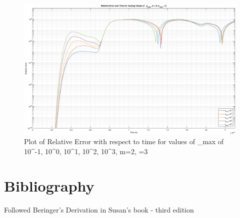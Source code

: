 \documentclass{article}
\begin{document}
\begin{figure}
  \centering
  \includegraphics[width=\textwidth]{Rel_Err_SigMax}
  \caption{Plot of Relative Error with respect to time for values of
    \sigma_{max} of 10^{-1}, 10^0, 10^1, 10^2, 10^3, m=2, =3}\label{fig:RelErrSigmax}
\end{figure}

\section{Bibliography}
Followed Beringer's Derivation in Susan's book - third edition
\end{document}
